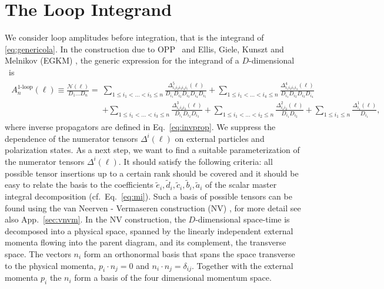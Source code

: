 \section{The Loop Integrand}
We consider loop amplitudes before integration,
that is the integrand of \eqref{eq:genericola}. In the construction due
to OPP~\cite{Ossola:2006us} and Ellis, Giele, Kunszt and Melnikov (EGKM) \cite{Ellis:2007br,Giele:2008ve}, the
generic expression for the integrand of a $D$-dimensional \ola~is
\begin{align}
\begin{split}
 A_n^{\text{1-loop}}(\ell)\equiv\frac{\mathcal{N}(\ell)}{D_1\dots D_n} =&\sum_{1\le i_1 < \dots < i_5 \le
   n}\frac{\Delta^5_{i_1i_2i_3i_4i_5}(\ell)}{D_{i_1}D_{i_2}D_{i_3}D_{i_4}D_{i_5}}+\sum_{1\le
   i_1 < \dots < i_4 \le
   n}\frac{\Delta^4_{i_1i_2i_3i_4}(\ell)}{D_{i_1}D_{i_2}D_{i_3}D_{i_4}}\\
&+\sum_{1\le i_1 < \dots < i_3 \le n}\frac{\Delta^3_{i_1i_2i_3}(\ell)}{D_{i_1}D_{i_2}D_{i_3}}+\sum_{1\le i_1 < \dots < i_2 \le n}\frac{\Delta^2_{i_1i_2}(\ell)}{D_{i_1}D_{i_2}}+\sum_{1\le i_1 \le n}\frac{\Delta^1_{i_1}(\ell)}{D_{i_1}},
\end{split}
\end{align}
where inverse propagators are defined in Eq.~\eqref{eq:invprop}. We
suppress the dependence of the numerator tensors $\Delta^i(\ell)$ on
external particles and polarization states. As a next step, we want to
find a suitable
parameterization of the numerator tensors $\Delta^i(\ell)$. It should
satisfy the following criteria: all possible tensor
insertions up to a certain rank should be covered and it should be easy to relate
the basis to the coefficients $\tilde{e}_i,\tilde{d}_i,\tilde{c}_i,\tilde{b}_i,\tilde{a}_i$ of the scalar master integral
decomposition (cf.~Eq.~\ref{eq:mi}). Such a basis of possible
tensors can be found using the van Neerven - Vermaseren construction (NV)
\cite{Neerven1984a}, for more detail see also App.~\ref{sec:vnvm}. In
the NV construction, the $D$-dimensional
space-time is decomposed into a physical space, spanned by the linearly
independent external momenta flowing into the parent diagram, and its complement, the
transverse space. The vectors $n_i$ form an orthonormal
basis that spans the space transverse to the
physical momenta, $p_i\cdot n_j = 0$ and $n_i
\cdot n_j = \delta_{ij}$. Together with the external momenta
$p_i$ the $n_i$ form a basis of the four dimensional
momentum space.


